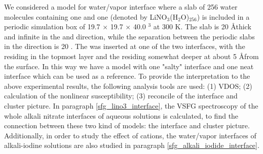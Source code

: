 We considered a model for water/vapor interface where a slab of 256 water molecules containing one \Li and 
one \nitrate (denoted by LiNO$_3$(H$_2$O)$_{256}$) is included in a periodic simulation box of 19.7 $\times $ 19.7 $\times $ 40.0 \A$^3$ at 300 K.
The slab is 20 \AA thick and infinite in the \X and \Y direction, while the
separation between the periodic slabs in the \Z direction is 20 \A.
The  \LiN was inserted at one of the two interfaces, with the \nitrate residing in the topmost layer and 
the \Li residing somewhat deeper at about 5 \AA from the surface. In this way we have a model with one "salty" interface
and one neat interface which can be used as a reference.  
To provide the interpretation to the above experimental results, the following analysis tools are used:
(1) VDOS; 
(2) calculation of the nonlinear susceptibility; 
(3) reconcile of the interface and cluster picture.
In paragraph \ref{sfg_lino3_interface}, the VSFG spectroscopy of the whole alkali nitrate interfaces of  aqueous solutions is calculated,
to find the connection between these two kind of models: the interface and cluster picture.
Additionally, in order to study the effect of cations, the water/vapor interfaces of alkali-iodine solutions are also studied in paragraph \ref{sfg_alkali_iodide_interface}.


